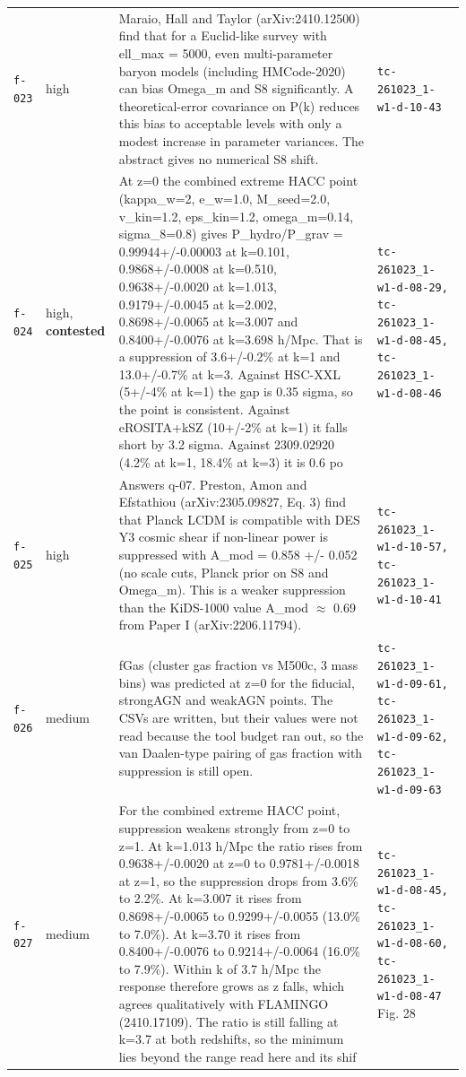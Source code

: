 \documentclass[11pt,a4paper]{article}
\begin{document}
\begin{longtable}{@{}p{}p{}p{}p{}@{}}
\texttt{f-023} & high & Maraio, Hall and Taylor (arXiv:2410.12500) find that for a Euclid-like survey with ell\_max = 5000, even multi-parameter baryon models (including HMCode-2020) can bias Omega\_m and S8 significantly. A theoretical-error covariance on P(k) reduces this bias to acceptable levels with only a modest increase in parameter variances. The abstract gives no numerical S8 shift. & \texttt{tc-261023\_\allowbreak{}1-w1-d-10-43} \\
\texttt{f-024} & high, \textbf{contested} & At z=0 the combined extreme HACC point (kappa\_w=2, e\_w=1.0, M\_seed=2.0, v\_kin=1.2, eps\_kin=1.2, omega\_m=0.14, sigma\_8=0.8) gives P\_hydro/P\_grav = 0.99944+/-0.00003 at k=0.101, 0.9868+/-0.0008 at k=0.510, 0.9638+/-0.0020 at k=1.013, 0.9179+/-0.0045 at k=2.002, 0.8698+/-0.0065 at k=3.007 and 0.8400+/-0.0076 at k=3.698 h/Mpc. That is a suppression of 3.6+/-0.2\% at k=1 and 13.0+/-0.7\% at k=3. Against HSC-XXL (5+/-4\% at k=1) the gap is 0.35 sigma, so the point is consistent. Against eROSITA+kSZ (10+/-2\% at k=1) it falls short by 3.2 sigma. Against 2309.02920 (4.2\% at k=1, 18.4\% at k=3) it is 0.6 po & \texttt{tc-261023\_\allowbreak{}1-w1-d-08-29,\allowbreak{} tc-261023\_\allowbreak{}1-w1-d-08-45,\allowbreak{} tc-261023\_\allowbreak{}1-w1-d-08-46} \\
\texttt{f-025} & high & Answers q-07. Preston, Amon and Efstathiou (arXiv:2305.09827, Eq. 3) find that Planck LCDM is compatible with DES Y3 cosmic shear if non-linear power is suppressed with A\_mod = 0.858 +/- 0.052 (no scale cuts, Planck prior on S8 and Omega\_m). This is a weaker suppression than the KiDS-1000 value A\_mod $\approx$ 0.69 from Paper I (arXiv:2206.11794). & \texttt{tc-261023\_\allowbreak{}1-w1-d-10-57,\allowbreak{} tc-261023\_\allowbreak{}1-w1-d-10-41} \\
\texttt{f-026} & medium & fGas (cluster gas fraction vs M500c, 3 mass bins) was predicted at z=0 for the fiducial, strongAGN and weakAGN points. The CSVs are written, but their values were not read because the tool budget ran out, so the van Daalen-type pairing of gas fraction with suppression is still open. & \texttt{tc-261023\_\allowbreak{}1-w1-d-09-61,\allowbreak{} tc-261023\_\allowbreak{}1-w1-d-09-62,\allowbreak{} tc-261023\_\allowbreak{}1-w1-d-09-63} \\
\texttt{f-027} & medium & For the combined extreme HACC point, suppression weakens strongly from z=0 to z=1. At k=1.013 h/Mpc the ratio rises from 0.9638+/-0.0020 at z=0 to 0.9781+/-0.0018 at z=1, so the suppression drops from 3.6\% to 2.2\%. At k=3.007 it rises from 0.8698+/-0.0065 to 0.9299+/-0.0055 (13.0\% to 7.0\%). At k=3.70 it rises from 0.8400+/-0.0076 to 0.9214+/-0.0064 (16.0\% to 7.9\%). Within k of 3.7 h/Mpc the response therefore grows as z falls, which agrees qualitatively with FLAMINGO (2410.17109). The ratio is still falling at k=3.7 at both redshifts, so the minimum lies beyond the range read here and its shif & \texttt{tc-261023\_\allowbreak{}1-w1-d-08-45,\allowbreak{} tc-261023\_\allowbreak{}1-w1-d-08-60,\allowbreak{} tc-261023\_\allowbreak{}1-w1-d-08-47} Fig. 28 \\

\end{longtable}
\end{document}
